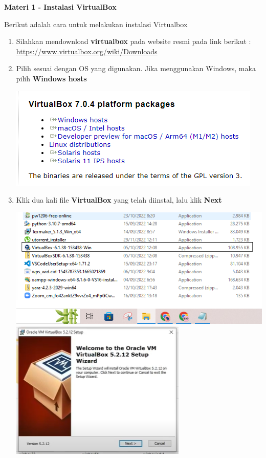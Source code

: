 \documentclass{article}
\begin{document}
    \begin{flushleft}
        \textbf{Materi 1 - Instalasi VirtualBox}
		\newline

		Berikut adalah cara untuk melakukan instalasi Virtualbox
        \begin{enumerate}
			\item Silahkan mendownload \textbf{virtualbox} pada website resmi pada link berikut : \url{https://www.virtualbox.org/wiki/Downloads} 
			
			\item  Pilih sesuai dengan OS yang digunakan. Jika menggunakan Windows, maka pilih \textbf{Windows hosts}
				
			\begin{center}
				\includegraphics[scale=0.9]{Screenshot1}      	
        	\end{center}
				
			\item Klik dua kali file \textbf{VirtualBox} yang telah diinstal, lalu klik \textbf{Next}
				
				\begin{center}
					\includegraphics[scale=0.6]{Capture2.1}
					\includegraphics[scale=0.8]{Capture}	
        		\end{center}
        		

\end{enumerate}
\end{flushleft}
\end{document}

